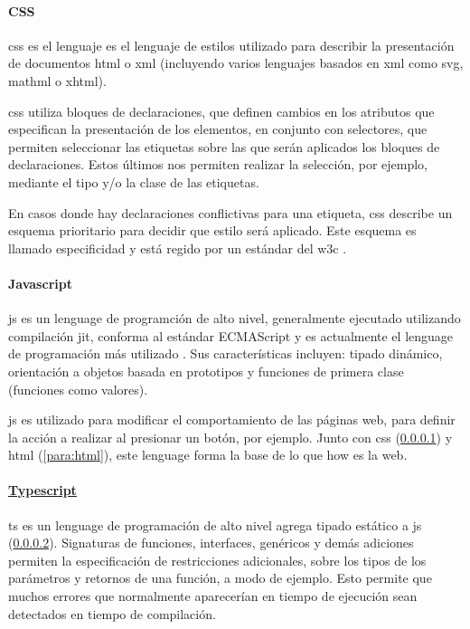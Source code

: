 \paragraph{CSS}\label{para:css}
\acrfull{css} es el lenguaje es el lenguaje de estilos utilizado para describir la presentación de documentos \acrshort{html} o \acrfull{xml} (incluyendo varios lenguajes basados en \acrshort{xml} como \acrfull{svg}, \acrshort{mathml} o \acrshort{xhtml}).

\acrshort{css} utiliza bloques de declaraciones, que definen cambios en los atributos que especifican la presentación de los elementos, en conjunto con selectores, que permiten seleccionar las etiquetas sobre las que serán aplicados los bloques de declaraciones. Estos últimos nos permiten realizar la selección, por ejemplo, mediante el tipo y/o la clase de las etiquetas.

En casos donde hay declaraciones conflictivas para una etiqueta, \acrshort{css} describe un esquema prioritario para decidir que estilo será aplicado. Este esquema es llamado especificidad y está regido por un estándar del \acrshort{w3c} \cite{w3cCSS}.

\paragraph{Javascript}\label{para:js}
\acrfull{js} es un lenguage de programción de alto nivel, generalmente ejecutado utilizando compilación \acrfull{jit}, conforma al estándar ECMAScript \cite{ecmascript} y es actualmente el lenguage de programación más utilizado \cite{devSurvey2024}. Sus características incluyen: tipado dinámico, orientación a objetos basada en prototipos y funciones de primera clase (funciones como valores).

\acrshort{js} es utilizado para modificar el comportamiento de las páginas web, para definir la acción a realizar al presionar un botón, por ejemplo. Junto con \acrshort{css} (\cref{para:css}) y \acrshort{html} (\cref{para:html}), este lenguage forma la base de lo que how es la web.

\paragraph{\href{https://www.typescriptlang.org/}{Typescript}}
\acrfull{ts} es un lenguage de programación de alto nivel agrega tipado estático a \acrshort{js} (\cref{para:js}). Signaturas de funciones, interfaces, genéricos y demás adiciones permiten la especificación de restricciones adicionales, sobre los tipos de los parámetros y retornos de una función, a modo de ejemplo. Esto permite que muchos errores que normalmente aparecerían en tiempo de ejecución sean detectados en tiempo de compilación.

